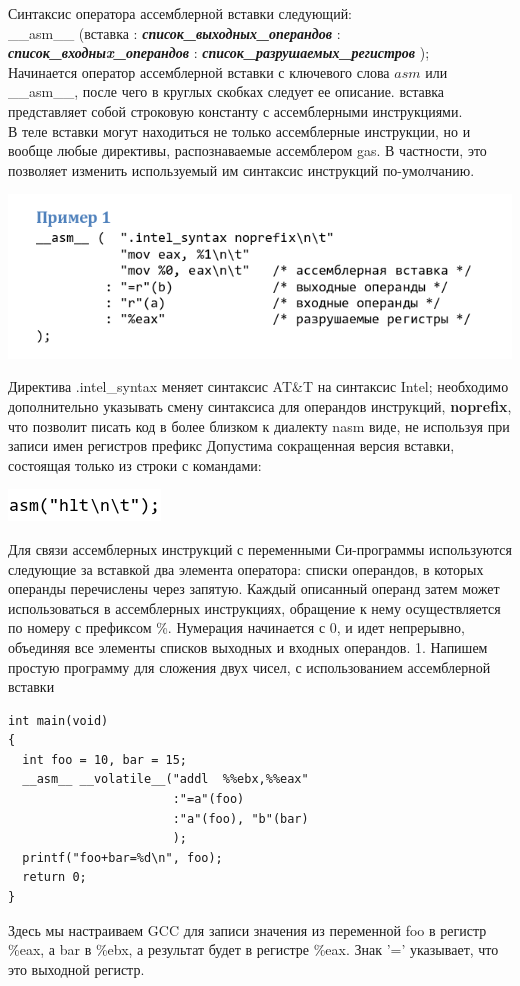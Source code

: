 \documentclass[12pt]{article}
\begin{document}
Синтаксис оператора ассемблерной вставки следующий:\\
\_\_asm\_\_  (вставка : \textit{\textbf{список\_выходных\_операндов}} : \textit{\textbf{список\_входныx\_операндов}} : \textit{\textbf{список\_разрушаемых\_регистров}} ); \\
Начинается оператор ассемблерной вставки с ключевого слова $asm$ или 
\_\_asm\_\_, после чего в круглых скобках следует ее описание. 
вставка представляет собой строковую константу с ассемблерными инструкциями. \\ 
В теле вставки могут находиться  не только ассемблерные инструкции,  но  и  вообще любые  директивы, распознаваемые ассемблером gas.  В  частности,  это  позволяет изменить  используемый  им синтаксис инструкций по-умолчанию.
\begin{flushleft}
\includegraphics[scale=0.75]{Selection_069.png} 
\end{flushleft}

Директива .intel\_syntax меняет  синтаксис AT\&T на синтаксис Intel;  необходимо дополнительно указывать смену синтаксиса для операндов инструкций, \textbf{noprefix}, что позволит писать код в более близком к диалекту nasm виде, не используя при записи имен регистров префикс %
Допустима сокращенная версия вставки, состоящая только из строки с командами: 
\begin{flushleft}
\includegraphics[scale=0.6]{Selection_070.png} 
\end{flushleft}
Для связи ассемблерных инструкций с переменными Си-программы используются следующие за вставкой два элемента оператора: списки операндов, в которых операнды перечислены через запятую. Каждый описанный операнд затем может использоваться в ассемблерных инструкциях, обращение к нему осуществляется по номеру с префиксом \%. Нумерация начинается с 0, и идет 
непрерывно, объединяя все элементы списков выходных и входных операндов.
1. Напишем простую программу для сложения двух чисел, с использованием ассемблерной вставки
\begin{verbatim}
int main(void)
{
  int foo = 10, bar = 15;
  __asm__ __volatile__("addl  %%ebx,%%eax"
                       :"=a"(foo)
                       :"a"(foo), "b"(bar)
                       );
  printf("foo+bar=%d\n", foo);
  return 0;
}
\end{verbatim}
Здесь мы настраиваем GCC для записи значения из переменной foo в регистр \%eax, а bar в \%ebx, а результат будет в регистре \%eax. Знак ’=’ указывает, что это выходной регистр. 
\end{document}
